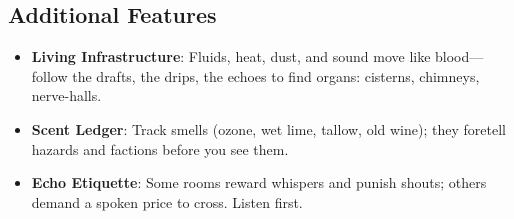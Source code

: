 \subsection*{Additional Features}
\begin{itemize}
\item \textbf{Living Infrastructure}: Fluids, heat, dust, and sound move like blood—follow the drafts, the drips, the echoes to find organs: cisterns, chimneys, nerve-halls.
\item \textbf{Scent Ledger}: Track smells (ozone, wet lime, tallow, old wine); they foretell hazards and factions before you see them.
\item \textbf{Echo Etiquette}: Some rooms reward whispers and punish shouts; others demand a spoken price to cross. Listen first.
\end{itemize}

